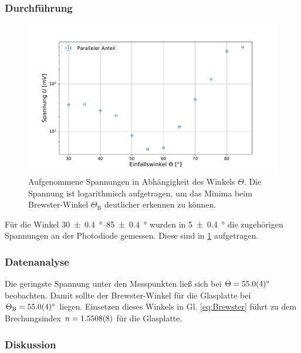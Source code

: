 	\subsubsection*{Durchführung}
		
		\begin{figure}[ht]
			\centering
			\includegraphics[width=\textwidth]{data/Spiegel.pdf}
			\caption{Aufgenommene Spannungen in Abhängigkeit des Winkels $\Theta$. Die Spannung ist logarithmisch aufgetragen, um das Minima beim Brewster-Winkel $\Theta_\text{B}$ deutlicher erkennen zu können.}
			\label{fig:GlasplatteWinkel}	
		\end{figure}
		Für die Winkel \SIrange{30+-0,4}{85+-0,4}{\degree} wurden in \SI{5+-0,4}{\degree} die zugehörigen Spannungen an der Photodiode gemessen.
		Diese sind in \ref{fig:GlasplatteWinkel} aufgetragen.
	
	\subsubsection*{Datenanalyse}
		
		Die geringste Spannung unter den Messpunkten ließ sich bei $\Theta = \SI{55+-0,4}{\degree}$ beobachten.
		Damit sollte der Brewster-Winkel für die Glasplatte bei $\Theta_\text{B} =  \SI{55+-0,4}{\degree}$ liegen.
		Einsetzen dieses Winkels in Gl. \ref{eq:Brewster} führt zu dem Brechungsindex $n = \SI{1,5508+-0,0008}{}$ für die Glasplatte.
	
	\subsubsection*{Diskussion}
		
